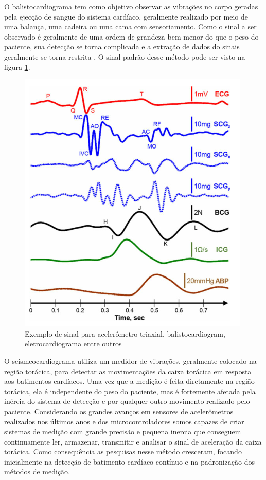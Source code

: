     O balistocardiograma tem como objetivo observar as vibrações no corpo geradas pela ejecção de sangue do sistema cardíaco, geralmente realizado por meio de uma balança, uma cadeira ou uma cama com sensoriamento. Como o sinal a ser observado é geralmente de uma ordem de grandeza bem menor do que o peso do paciente, sua detecção se torna complicada e a extração de dados do sinais geralmente se torna restrita \cite{ballistoAndSeisReview}, O sinal padrão desse método pode ser visto na figura \ref{fig:sigs}. 

\begin{figure}[H]
    \center
    \includegraphics[width=0.4\linewidth]{img/sisBalRevFig1.png}
    \caption{Exemplo de sinal para acelerômetro triaxial, balistocardiogram, eletrocardiograma entre outros}
    \label{fig:sigs}
\end{figure}

    O seismeocardiograma utiliza um medidor de vibrações, geralmente colocado na região torácica, para detectar as movimentações da caixa torácica em resposta aos batimentos cardíacos\cite{ballistoAndSeisReview}. Uma vez que a medição é feita diretamente na região torácica, ela é independente do peso do paciente, mas é fortemente afetada pela inércia do sistema de detecção e por qualquer outro movimento realizado pelo paciente. Considerando os grandes avanços em sensores de acelerômetros realizados nos últimos anos 
e dos microcontroladores somos capazes de criar sistemas de medição com grande precisão e pequena inercia que conseguem continuamente ler, armazenar, transmitir e analisar o sinal de aceleração da caixa torácica\cite{06347128}. Como consequência as pesquisas nesse método cresceram, focando inicialmente na detecção de batimento cardíaco contínuo e na padronização dos métodos de medição\cite{06567772}.

